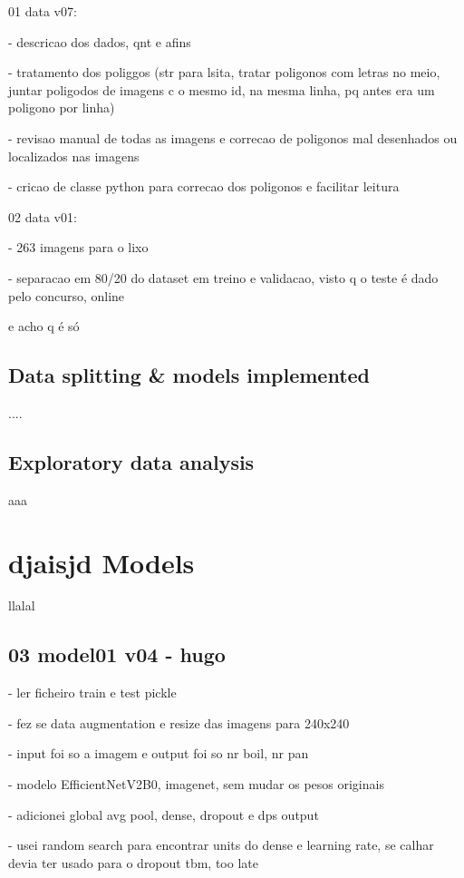 \documentclass[conference]{IEEEtran}
\begin{document}
01 data v07:

- descricao dos dados, qnt e afins

- tratamento dos poliggos (str para lsita, tratar poligonos com letras no meio, juntar poligodos de imagens c o mesmo id, na mesma linha, pq antes era um poligono por linha)

- revisao manual de todas as imagens e correcao de poligonos mal desenhados ou localizados nas imagens

- cricao de classe python para correcao dos poligonos e facilitar leitura

02 data v01:

- 263 imagens para o lixo

- separacao em 80/20 do dataset em treino e validacao, visto q o teste é dado pelo concurso, online

e acho q é só


\subsection{Data splitting \& models implemented}

....

\subsection{Exploratory data analysis}


aaa


\section{djaisjd Models}

llalal

\subsection{03 model01 v04 - hugo}

- ler ficheiro train e test pickle

- fez se data augmentation e resize das imagens para 240x240

- input foi so a imagem e output foi so nr boil, nr pan

- modelo EfficientNetV2B0, imagenet, sem mudar os pesos originais

- adicionei global avg pool, dense, dropout e dps output

- usei random search para encontrar units do dense e learning rate, se calhar devia ter usado para o dropout tbm, too late
\end{document}
